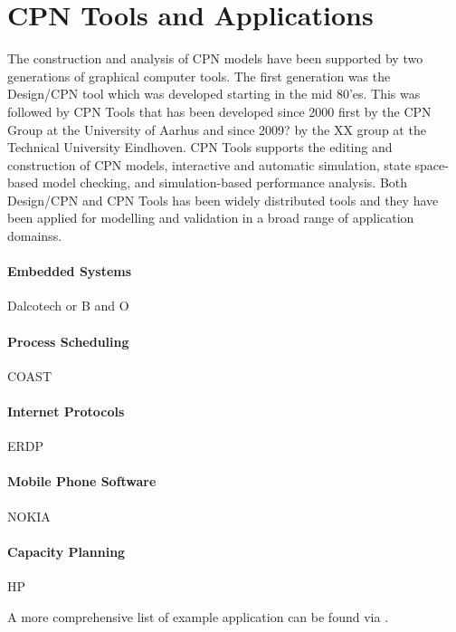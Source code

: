 
\section{CPN Tools and Applications}

The construction and analysis of CPN models have been supported by two
generations of graphical computer tools. The first generation was the
Design/CPN tool \cite{X} which was developed starting in the mid
80'es. This was followed by CPN Tools \cite{Y} that has been developed
since 2000 first by the CPN Group at the University of Aarhus and
since 2009? by the XX group at the Technical University Eindhoven. CPN
Tools supports the editing and construction of CPN models, interactive
and automatic simulation, state space-based model checking, and
simulation-based performance analysis. Both Design/CPN and CPN Tools
has been widely distributed tools and they have been applied for
modelling and validation in a broad range of application domainss. 

\paragraph{Embedded Systems} Dalcotech or B and O

\paragraph{Process Scheduling} COAST

\paragraph{Internet Protocols} ERDP

\paragraph{Mobile Phone Software} NOKIA

\paragraph{Capacity Planning} HP

A more comprehensive list of example application can be found via
\cite{X}.

